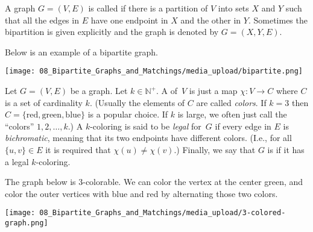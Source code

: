 \begin{flex}
\label{grp:definition:Bipartite-graph}

\begin{definition}
\label{definition:Bipartite-graph}
A graph $G = (V,E)$ is called  if there is a partition of $V$ into sets $X$ and $Y$ such that all the edges in $E$ have one endpoint in $X$ and the other in $Y$. Sometimes the bipartition is given explicitly and the graph is denoted by $G = (X, Y, E)$. 

\end{definition}

\begin{example}
\label{example:Bipartite-graph-example}
Below is an example of a bipartite graph.
\begin{center}
    \texttt{[image: 08\_Bipartite\_Graphs\_and\_Matchings/media\_upload/bipartite.png]}
\end{center}

\end{example}
\end{flex}

\begin{flex}
\label{grp:definition:k-colorable-graphs}

\begin{definition}
\label{definition:k-colorable-graphs}
Let $G = (V,E)$ be a graph.  Let $k \in \mathbb{N}^+$. A  of~$V$ is just a map $\chi : V \to C$ where $C$ is a set of cardinality $k$.  (Usually the elements of $C$ are called \emph{colors}.  If $k = 3$ then $C = \{\text{red},\text{green},\text{blue}\}$ is a popular choice. If $k$ is large, we often just call the ``colors'' $1,2, \dots, k$.)  A $k$-coloring is said to be \emph{legal} for~$G$ if every edge in $E$ is \emph{bichromatic}, meaning that its two endpoints have different colors.  (I.e., for all $\{u,v\} \in E$ it is required that $\chi(u)\neq\chi(v)$.)  Finally, we say that $G$ is  if it has a legal $k$-coloring.

\end{definition}

\begin{example}
\label{example:A-3-colorable-graph}
The graph below is 3-colorable. We can color the vertex at the center green, and color the outer vertices with blue and red by alternating those two colors.
\begin{center}
    \texttt{[image: 08\_Bipartite\_Graphs\_and\_Matchings/media\_upload/3-colored-graph.png]}
\end{center}

\end{example}
\end{flex}

